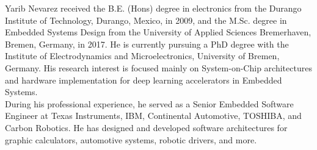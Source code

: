 \begin{IEEEbiography}{Yarib Nevarez} received the B.E. (Hons) degree in electronics from the Durango Institute of Technology, Durango, Mexico, in 2009, and the M.Sc. degree in Embedded Systems Design from the University of Applied Sciences Bremerhaven, Bremen, Germany, in 2017. He is currently pursuing a PhD degree with the Institute of Electrodynamics and Microelectronics, University of Bremen, Germany. His research interest is focused mainly on System-on-Chip architectures and hardware implementation for deep learning accelerators in Embedded Systems.
\\
During his professional experience, he served as a Senior Embedded Software Engineer at Texas Instruments, IBM, Continental Automotive, TOSHIBA, and Carbon Robotics. He has designed and developed software architectures for graphic calculators, automotive systems, robotic drivers, and more.
	
\end{IEEEbiography}

